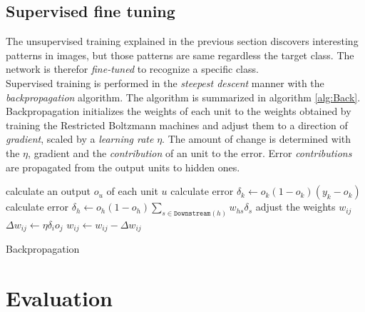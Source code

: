 
\subsection{Supervised fine tuning}

The unsupervised training explained in the previous section discovers interesting patterns in images, but those patterns are same regardless the target class. The network is therefor \textit{fine-tuned} to recognize a specific class. \\

Supervised training is performed in the \textit{steepest descent} manner with the \textit{backpropagation} algorithm. The algorithm is summarized in algorithm \ref{alg:Back}. Backpropagation initializes the weights of each unit to the weights obtained by training the Restricted Boltzmann machines and adjust them to a direction of \textit{gradient}, scaled by a \textit{learning rate} $\eta$. The amount of change is determined with the $\eta$, gradient and the \textit{contribution} of an unit to the error. Error \textit{contributions} are propagated from the output units to hidden ones. 

\begin{algorithm}
	\begin{algorithmic}[1]
					\State calculate an output  $o_u$ of each unit $u$
						\State calculate error $\delta_k \gets o_k(1-o_k)(y_k - o_k)$					
					\EndFor 
						\State calculate error $\delta_h \gets o_h(1-o_h)\sum_{s \in \mathtt{Downstream}(h)}w_{hs}\delta_s$ 					
					\EndFor
					\State adjust the weights $w_{ij}$
					\Statex \quad \quad $\Delta w_{ij} \gets \eta \delta_i o_j$ 
					\Statex \quad \quad $w_{ij} \gets w_{ij} - \Delta w_{ij}$
				\EndFor
			\EndWhile
		\EndFunction
	\end{algorithmic}
	\caption{Backpropagation}
	\label{alg:Back}
\end{algorithm} 




\section{Evaluation}


